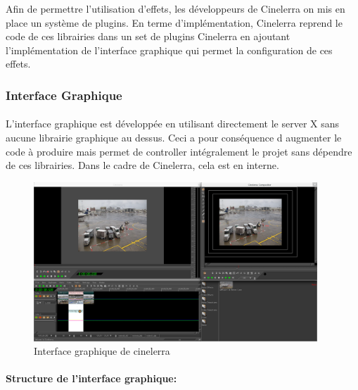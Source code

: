 Afin de permettre l'utilisation d'effets, les développeurs de Cinelerra
on mis en place un système de plugins. En terme d'implémentation,
Cinelerra reprend le code de ces librairies dans un set de plugins
Cinelerra en ajoutant l'implémentation de l'interface graphique qui
permet la configuration de ces effets.

\subsubsection{Interface Graphique}

\paragraph{}

L'interface graphique est développée en utilisant directement le server
X sans aucune librairie graphique au dessus. Ceci a pour conséquence
d augmenter le code à produire mais permet de controller intégralement
le projet sans dépendre de ces librairies.  Dans le cadre de Cinelerra,
cela est %
en interne.

\begin{figure} [H]

  \begin{center}

    \includegraphics[width=0.95\textwidth]{images/cinelerra}

  \end{center}

  \caption{Interface graphique de cinelerra}

  \label{Yes}

\end{figure}

\paragraph{Structure de l'interface graphique:}

